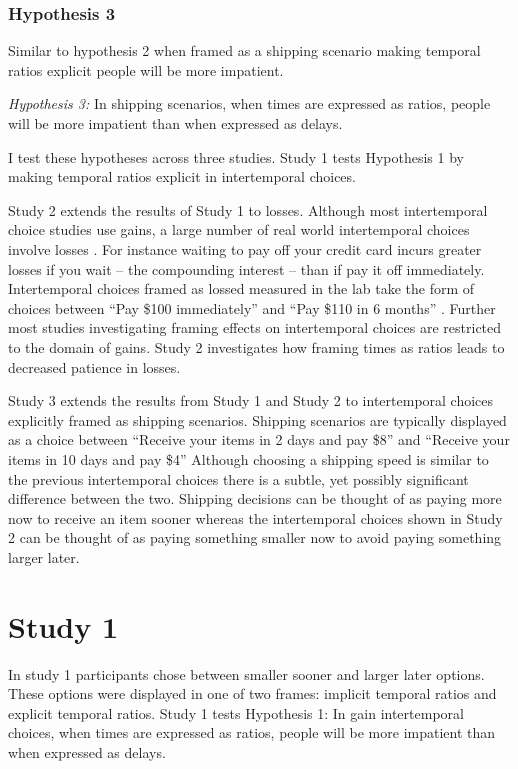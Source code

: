 \documentclass[]{article}
\begin{document}
\subsubsection{Hypothesis 3}
Similar to hypothesis 2 when framed as a shipping scenario making temporal ratios explicit people will be more impatient. 

\textit{Hypothesis 3:} In shipping scenarios, when times are expressed as ratios, people will be more impatient than when expressed as delays. 



I test these hypotheses across three studies.
Study 1 tests Hypothesis 1 by making temporal ratios explicit in intertemporal choices. 

Study 2 extends the results of Study 1 to losses. 
Although most intertemporal choice studies use gains, a large number of real world intertemporal choices involve losses \cite{Hardisty2013}. 
For instance waiting to pay off your credit card incurs greater losses if you wait -- the compounding interest -- than if pay it off immediately.
Intertemporal choices framed as lossed measured in the lab take the form of choices between ``Pay \$100 immediately'' and  ``Pay \$110 in 6 months'' \cite{Hardisty2015}.
Further most studies investigating framing effects on intertemporal choices are restricted to the domain of gains. 
Study 2 investigates how framing times as ratios leads to decreased patience in losses. 

Study 3 extends the results from Study 1 and Study 2 to intertemporal choices explicitly framed as shipping scenarios.
Shipping scenarios are typically displayed as a choice between ``Receive your items in 2 days and pay \$8'' and ``Receive your items in 10 days and pay \$4''
Although choosing a shipping speed is similar to the previous intertemporal choices there is a subtle, yet possibly significant difference between the two.
Shipping decisions can be thought of as paying more now to receive an item sooner whereas the intertemporal choices shown in Study 2 can be thought of as paying something smaller now to avoid paying something larger later. 



\section{Study 1}
In study 1 participants chose between smaller sooner and larger later options. 
These options were displayed in one of two frames: implicit temporal ratios and explicit temporal ratios. 
Study 1 tests Hypothesis 1: In gain intertemporal choices, when times are expressed as ratios, people will be more impatient than when expressed as delays. 
\end{document}
